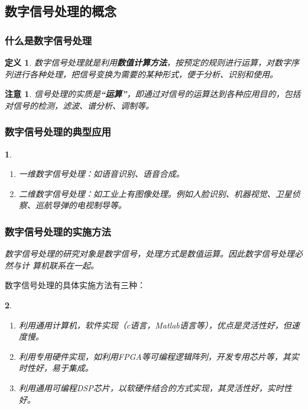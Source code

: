 \documentclass[notheorems,compress,mathserif,table]{beamer}
\newtheorem{definition}{定义}
\newtheorem{dablock}{}
\newtheorem{zhuyi}{注意}
\begin{document}
\subsection{数字信号处理的概念}
\begin{frame}[shrink]\frametitle{什么是数字信号处理}%
\begin{definition}
数字信号处理就是利用\textbf{数值计算方法}，按预定的规则进行运算，对数字序列进行各种处理，把信号变换为需要的某种形式，便于分析、识别和使用。
\end{definition}

\begin{zhuyi}
信号处理的实质是\textbf{“运算”}，即通过对信号的运算达到各种应用目的，包括对信号的检测，滤波、谱分析、调制等。
\end{zhuyi}

\end{frame}
%
%
%
%
%
%
\begin{frame}[shrink]\frametitle{  数字信号处理的典型应用 }%
\begin{dablock}
\begin{enumerate}
    \item 一维数字信号处理：如语音识别、语音合成。
    \item 二维数字信号处理：如工业上有图像处理。例如人脸识别、机器视觉、卫星侦察、巡航导弹的电视制导等。
\end{enumerate}
\end{dablock}
\end{frame}
%
%
%
%
%
%
\begin{frame}[shrink]\frametitle{  数字信号处理的实施方法 }%


\quad\quad \emph{数字信号处理的研究对象是数字信号，处理方式是数值运算。因此数字信号处理必然与计
算机联系在一起。}\newline

数字信号处理的具体实施方法有三种：
\begin{dablock}
\begin{enumerate}
    \item  利用通用计算机，软件实现（c语言，Matlab语言等），优点是灵活性好，但速度慢。
    \item  利用专用硬件实现，如利用FPGA等可编程逻辑阵列，开发专用芯片等，其实时性好，易于集成。
    \item  利用通用可编程DSP芯片，以软硬件结合的方式实现，其灵活性好，实时性好。
\end{enumerate}
\end{dablock}
\end{frame}
\end{document}
